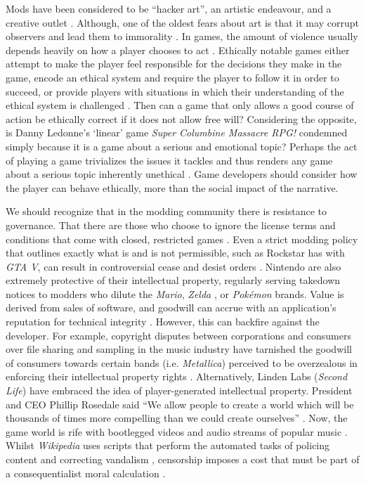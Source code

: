 \documentclass{scrartcl}
\begin{document}
Mods have been considered to be ``hacker art'', an artistic endeavour, and a creative outlet \cite{sotamaa2010game}. Although, one of the oldest fears about art is that it may corrupt observers and lead them to immorality \cite{schulzke2009moral}. In games, the amount of violence usually depends heavily on how a player chooses to act \cite{schulzke2010defending}. Ethically notable games either attempt to make the player feel responsible for the decisions they make in the game, encode an ethical system and require the player to follow it in order to succeed, or provide players with situations in which their understanding of the ethical system is challenged \cite{zagal2009ethically}. Then can a game that only allows a good course of action be ethically correct if it does not allow free will? Considering the opposite, is Danny Ledonne's `linear' game \textit{Super Columbine Massacre RPG!} condemned simply because it is a game about a serious and emotional topic? Perhaps the act of playing a game trivializes the issues it tackles and thus renders any game about a serious topic inherently unethical \cite{zagal2009ethically}. Game developers should consider how the player can behave ethically, more than the social impact of the narrative.

We should recognize that in the modding community there is resistance to governance. That there are those who choose to ignore the license terms and conditions that come with closed, restricted games \cite{scacchi2010computer}. Even a strict modding policy that outlines exactly what is and is not permissible, such as Rockstar has with \textit{GTA V}, can result in controversial cease and desist orders \cite{gta1}. Nintendo are also extremely protective of their intellectual property, regularly serving takedown notices to modders who dilute the \textit{Mario}, \textit{Zelda} \cite{nintendo1}, or \textit{Pok{\'e}mon} \cite{pokemon1} brands. Value is derived from sales of software, and goodwill can accrue with an application's reputation for technical integrity \cite{herman2006your}. However, this can backfire against the developer. For example, copyright disputes between corporations and consumers over file sharing and sampling in the music industry have tarnished the goodwill of consumers towards certain bands (i.e. \textit{Metallica}) perceived to be overzealous in enforcing their intellectual property rights \cite{herman2006your}. 
Alternatively, Linden Labs (\textit{Second Life}) have embraced the idea of player-generated intellectual property. President and CEO Phillip Rosedale said ``We allow people to create a world which will be thousands of times more compelling than we could create ourselves'' \cite{herman2006your}. Now, the game world is rife with bootlegged videos and audio streams of popular music \cite{herman2006your}. Whilst \textit{Wikipedia} uses scripts that perform the automated tasks of policing content and correcting vandalism \cite{hong2014becoming}, censorship imposes a cost that must be part of a consequentialist moral calculation \cite{schulzke2010defending}.
\end{document}

